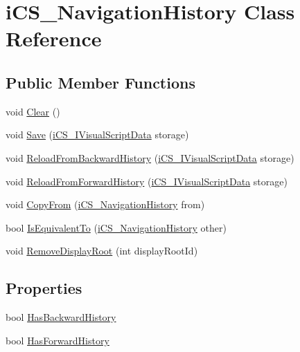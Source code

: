 \hypertarget{classi_c_s___navigation_history}{\section{i\+C\+S\+\_\+\+Navigation\+History Class Reference}
\label{classi_c_s___navigation_history}
}
\subsection*{Public Member Functions}
\begin{DoxyCompactItemize}
\item 
void \hyperlink{classi_c_s___navigation_history_aa547332218fd3b3dd2deb8be031585e8}{Clear} ()
\item 
void \hyperlink{classi_c_s___navigation_history_adf208971b642f5b9c95ad0eddfdf7d96}{Save} (\hyperlink{interfacei_c_s___i_visual_script_data}{i\+C\+S\+\_\+\+I\+Visual\+Script\+Data} storage)
\item 
void \hyperlink{classi_c_s___navigation_history_a3195e4301623509d06ad2a4d2a568a31}{Reload\+From\+Backward\+History} (\hyperlink{interfacei_c_s___i_visual_script_data}{i\+C\+S\+\_\+\+I\+Visual\+Script\+Data} storage)
\item 
void \hyperlink{classi_c_s___navigation_history_aece0fd96a50092a3fd7107ba01f8f7ba}{Reload\+From\+Forward\+History} (\hyperlink{interfacei_c_s___i_visual_script_data}{i\+C\+S\+\_\+\+I\+Visual\+Script\+Data} storage)
\item 
void \hyperlink{classi_c_s___navigation_history_ac7e8f32de19d432c4b29b7cd7dacc67b}{Copy\+From} (\hyperlink{classi_c_s___navigation_history}{i\+C\+S\+\_\+\+Navigation\+History} from)
\item 
bool \hyperlink{classi_c_s___navigation_history_aaf109c87e2dfa2cbf993767bb1794e6c}{Is\+Equivalent\+To} (\hyperlink{classi_c_s___navigation_history}{i\+C\+S\+\_\+\+Navigation\+History} other)
\item 
void \hyperlink{classi_c_s___navigation_history_ac7f7a68bc7f430b6ef2eaf221539f608}{Remove\+Display\+Root} (int display\+Root\+Id)
\end{DoxyCompactItemize}
\subsection*{Properties}
\begin{DoxyCompactItemize}
\item 
bool \hyperlink{classi_c_s___navigation_history_aeee34cf59f305efa825be707edb6610d}{Has\+Backward\+History}
\item 
bool \hyperlink{classi_c_s___navigation_history_ac5a56449c385b8effd80741ac728ef19}{Has\+Forward\+History}
\end{DoxyCompactItemize}


